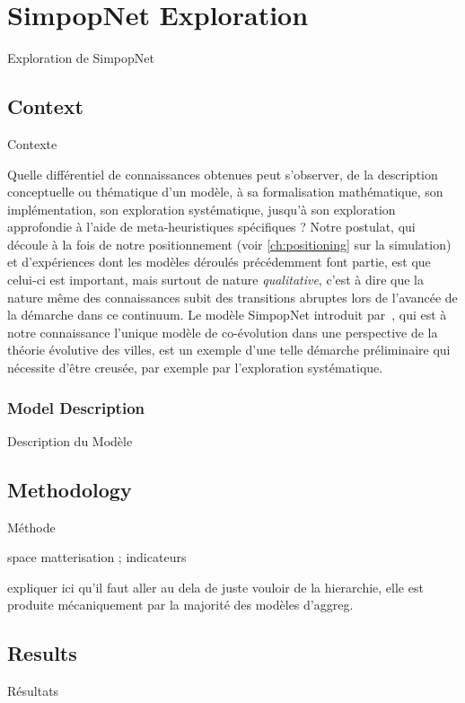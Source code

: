 




\newpage


\section[SimpopNet Exploration][Exploration de SimpopNet]{SimpopNet Exploration}{Exploration de SimpopNet}


 
\subsection{Context}{Contexte}

Quelle différentiel de connaissances obtenues peut s'observer, de la description conceptuelle ou thématique d'un modèle, à sa formalisation mathématique, son implémentation, son exploration systématique, jusqu'à son exploration approfondie à l'aide de meta-heuristiques spécifiques ? Notre postulat, qui découle à la fois de notre positionnement (voir \autoref{ch:positioning} sur la simulation) et d'expériences dont les modèles déroulés précédemment font partie, est que celui-ci est important, mais surtout de nature \emph{qualitative}, c'est à dire que la nature même des connaissances subit des transitions abruptes lors de l'avancée de la démarche dans ce continuum. Le modèle SimpopNet introduit par~\cite{schmitt2014modelisation}, qui est à notre connaissance l'unique modèle de co-évolution dans une perspective de la théorie évolutive des villes, est un exemple d'une telle démarche préliminaire qui nécessite d'être creusée, par exemple par l'exploration systématique.


\subsubsection{Model Description}{Description du Modèle}




\subsection{Methodology}{Méthode}

space matterisation ; indicateurs

expliquer ici qu'il faut aller au dela de juste vouloir de la hierarchie, elle est produite mécaniquement par la majorité des modèles d'aggreg.


\subsection{Results}{Résultats}










